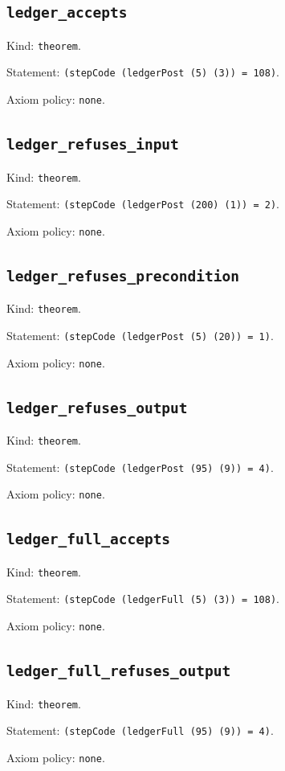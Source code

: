 \documentclass[11pt]{article}
\begin{document}
\subsection*{\texttt{ledger\_accepts}}
\noindent Kind: \texttt{theorem}.\par
\noindent Statement: \texttt{(stepCode (ledgerPost (5) (3)) = 108)}.\par
\noindent Axiom policy: \texttt{none}.\par
\subsection*{\texttt{ledger\_refuses\_input}}
\noindent Kind: \texttt{theorem}.\par
\noindent Statement: \texttt{(stepCode (ledgerPost (200) (1)) = 2)}.\par
\noindent Axiom policy: \texttt{none}.\par
\subsection*{\texttt{ledger\_refuses\_precondition}}
\noindent Kind: \texttt{theorem}.\par
\noindent Statement: \texttt{(stepCode (ledgerPost (5) (20)) = 1)}.\par
\noindent Axiom policy: \texttt{none}.\par
\subsection*{\texttt{ledger\_refuses\_output}}
\noindent Kind: \texttt{theorem}.\par
\noindent Statement: \texttt{(stepCode (ledgerPost (95) (9)) = 4)}.\par
\noindent Axiom policy: \texttt{none}.\par
\subsection*{\texttt{ledger\_full\_accepts}}
\noindent Kind: \texttt{theorem}.\par
\noindent Statement: \texttt{(stepCode (ledgerFull (5) (3)) = 108)}.\par
\noindent Axiom policy: \texttt{none}.\par
\subsection*{\texttt{ledger\_full\_refuses\_output}}
\noindent Kind: \texttt{theorem}.\par
\noindent Statement: \texttt{(stepCode (ledgerFull (95) (9)) = 4)}.\par
\noindent Axiom policy: \texttt{none}.\par
\end{document}
